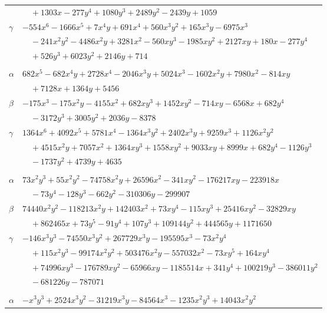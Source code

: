 \documentclass[11pt]{article}
\begin{document}
\begin{longtable}{@{}ll@{}}
 & $\quad +1303x-277y^{4}+1080y^{3}+2489y^{2}-2439y+1059$\\
$\gamma$ & $-554x^{6}-1666x^{5}+7x^{4}y+691x^{4}+560x^{3}y^{2}+165x^{3}y-6975x^{3}$\\
 & $\quad -241x^{2}y^{2}-4486x^{2}y+3281x^{2}-560xy^{3}-1985xy^{2}+2127xy+180x-277y^{4}$\\
 & $\quad +526y^{3}+6023y^{2}+2146y+714$\\
\addlinespace[3pt]
\multicolumn{2}{@{}l}{$\{i,j\}=\{53,134\}$, $k_{ij}=2^{3}\cdot 3^{2}\cdot 7$}\\
$\alpha$ & $682x^{5}-682x^{4}y+2728x^{4}-2046x^{3}y+5024x^{3}-1602x^{2}y+7980x^{2}-814xy$\\
 & $\quad +7128x+1364y+5456$\\
$\beta$ & $-175x^{3}-175x^{2}y-4155x^{2}+682xy^{3}+1452xy^{2}-714xy-6568x+682y^{4}$\\
 & $\quad -3172y^{3}+3005y^{2}+2036y-8378$\\
$\gamma$ & $1364x^{6}+4092x^{5}+5781x^{4}-1364x^{3}y^{2}+2402x^{3}y+9259x^{3}+1126x^{2}y^{2}$\\
 & $\quad +4515x^{2}y+7057x^{2}+1364xy^{3}+1558xy^{2}+9033xy+8999x+682y^{4}-1126y^{3}$\\
 & $\quad -1737y^{2}+4739y+4635$\\
\addlinespace[3pt]
\multicolumn{2}{@{}l}{$\{i,j\}=\{53,172\}$, $k_{ij}=2^{6}\cdot 3^{4}\cdot 7^{2}$}\\
$\alpha$ & $73x^{2}y^{3}+55x^{2}y^{2}-74758x^{2}y+26596x^{2}-341xy^{2}-176217xy-223918x$\\
 & $\quad -73y^{4}-128y^{3}-662y^{2}-310306y-299907$\\
$\beta$ & $74440x^{2}y^{2}-118213x^{2}y+142403x^{2}+73xy^{4}-115xy^{3}+25416xy^{2}-32829xy$\\
 & $\quad +862465x+73y^{5}-91y^{4}+107y^{3}+109144y^{2}+444565y+1171650$\\
$\gamma$ & $-146x^{3}y^{3}-74550x^{3}y^{2}+267729x^{3}y-195595x^{3}-73x^{2}y^{4}$\\
 & $\quad +115x^{2}y^{3}-99174x^{2}y^{2}+503476x^{2}y-557032x^{2}-73xy^{5}+164xy^{4}$\\
 & $\quad +74996xy^{3}-176789xy^{2}-65966xy-1185514x+341y^{4}+100219y^{3}-386011y^{2}$\\
 & $\quad -681226y-787071$\\
\addlinespace[3pt]
\multicolumn{2}{@{}l}{$\{i,j\}=\{53,173\}$, $k_{ij}=2^{5}\cdot 3^{3}\cdot 5\cdot 43$}\\
$\alpha$ & $-x^{3}y^{3}+2524x^{3}y^{2}-31219x^{3}y-84564x^{3}-1235x^{2}y^{3}+14043x^{2}y^{2}$\\

\end{longtable}
\end{document}
